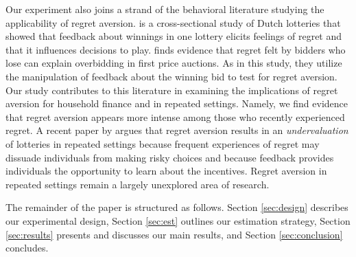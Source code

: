 \documentclass[11pt]{article}
\begin{document}
	Our experiment also joins a strand of the behavioral literature studying the applicability of regret aversion. \textcite{zeelenberg_consequences_2004} is a cross-sectional study of Dutch lotteries that showed that feedback about winnings in one lottery elicits feelings of regret and that it influences decisions to play. \textcite{filiz-ozbay_auctions_2007} finds evidence that regret felt by bidders who lose can explain overbidding in first price auctions. As in this study, they utilize the manipulation of feedback about the winning bid to test for regret aversion. Our study contributes to this literature in examining the implications of regret aversion for household finance and in repeated settings. Namely, we find evidence that regret aversion appears more intense among those who recently experienced regret. A recent paper by \textcite{imas_regret_2016} argues that regret aversion results in an \emph{undervaluation} of lotteries in repeated settings because frequent experiences of regret may dissuade individuals from making risky choices and because feedback provides individuals the opportunity to learn about the incentives. Regret aversion in repeated settings remain a largely unexplored area of research.

	The remainder of the paper is structured as follows. Section \ref{sec:design} describes our experimental design, Section \ref{sec:est} outlines our estimation strategy, Section \ref{sec:results} presents and discusses our main results, and Section \ref{sec:conclusion} concludes.


\end{document}
